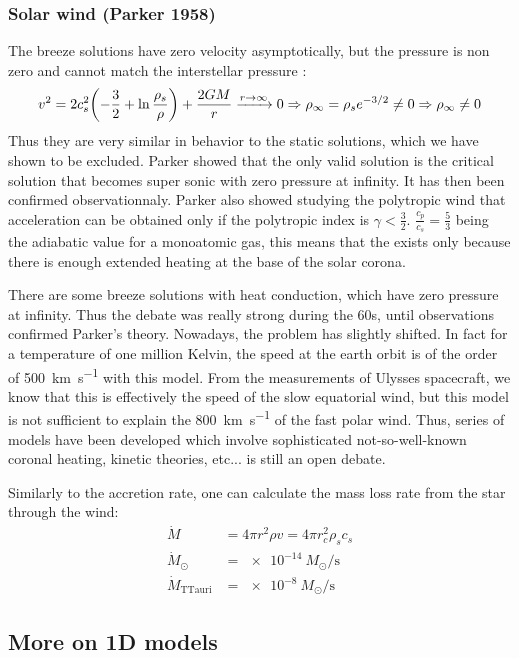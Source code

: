 \documentclass[10pt,a4paper,english]{article}
\let\originalleft\left
\let\originalright\right
\renewcommand{\left}{\mathopen{}\mathclose\bgroup\originalleft}
\renewcommand{\right}{\aftergroup\egroup\originalright}
\begin{document}
\subsubsection{Solar wind (Parker 1958)}
The breeze solutions have zero velocity asymptotically, but the pressure is non zero and cannot match the interstellar pressure :
\begin{equation}
    v^2 = 2 c_s^2 \left( -\frac{3}{2} + \ln \frac{\rho_s}{\rho} \right) + \frac{2GM}{r} \xrightarrow{r\to\infty} 0\Rightarrow \rho_\infty = \rho_s e^{-3/2} \neq 0 \Rightarrow \rho_\infty \neq 0
\end{equation}
Thus they are very similar in behavior to the static solutions, which we have shown to be excluded. Parker showed that the only valid solution is the critical solution that becomes super sonic with zero pressure at infinity. It has then been confirmed observationnaly. Parker also showed studying the polytropic wind that acceleration can be obtained only if the polytropic index is $\gamma < \frac{3}{2}$. $\frac{c_p}{c_s} = \frac{5}{3}$ being the adiabatic value for a monoatomic gas, this means that the exists only because there is enough extended heating at the base of the solar corona.

There are some breeze solutions with heat conduction, which have zero pressure at infinity. Thus the debate was really strong during the 60s, until observations confirmed Parker's theory. Nowadays, the problem has slightly shifted. In fact for a temperature of one million Kelvin, the speed at the earth orbit is of the order of \SI{500}{\km\per\s} with this model. From the measurements of Ulysses spacecraft, we know that this is effectively the speed of the slow equatorial wind, but this model is not sufficient to explain the \SI{800}{\km\per\s} of the fast polar wind. Thus, series of models have been developed which involve sophisticated not-so-well-known coronal heating, kinetic theories, etc... is still an open debate.

Similarly to the accretion rate, one can calculate the mass loss rate from the star through the wind:
\begin{align}
    \dot{M} & = 4\pi r^2\rho v = 4\pi r^2_c\rho_sc_s \\
    \dot{M}_\odot & = \SI{e-14}{M_\odot\per\s} \\
    \dot{M}_\mathrm{TTauri} &= \SI{e-8}{M_\odot\per\s}
\end{align}

\subsection{More on 1D models}
\end{document}
